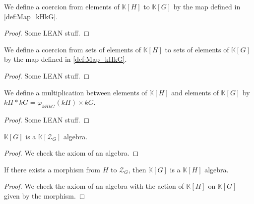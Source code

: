 \begin{definition}
    \label{def:Coe_kH_kG}
    \leanok
    We define a coercion from elements of $\mathbb{K}[H]$ to $\mathbb{K}[G]$ by the map defined in \ref{def:Map_kHkG}.
    \begin{proof}
        \leanok
        Some LEAN stuff.
    \end{proof}
\end{definition}

\begin{definition}
    \label{def:Set_Coe}
    \leanok
    We define a coercion from sets of elements of $\mathbb{K}[H]$ to sets of elements of $\mathbb{K}[G]$ by 
    the map defined in \ref{def:Map_kHkG}.
    \begin{proof}
        \leanok
        Some LEAN stuff.
    \end{proof}
\end{definition}

\begin{definition}
    \label{def:Smul_kHkG}
    \leanok
    We define a multiplication between elements of $\mathbb{K}[H]$ and elements of $\mathbb{K}[G]$ by 
    $kH*kG=\varphi_{kHkG}(kH)\times kG$.
    \begin{proof}
        \leanok
        Some LEAN stuff.
    \end{proof}
\end{definition}

\begin{proposition}
    \label{prop:kG_is_kCenter_Algebra}
    \leanok
    $\mathbb{K}[G]$ is a $\mathbb{K}[\mathcal{Z}_G]$ algebra.
\end{proposition}
\begin{proof}
    \leanok
    We check the axiom of an algebra.
\end{proof}

\begin{proposition}
    \label{prop:kG_is_kH_Algebra}
    \leanok
    If there exists a morphism from $H$ to $\mathcal{Z}_G$, then $\mathbb{K}[G]$ is a $\mathbb{K}[H]$ algebra.
\end{proposition}
\begin{proof}
    \leanok
    We check the axiom of an algebra with the action of $\mathbb{K}[H]$ on $\mathbb{K}[G]$ given by the morphism.
\end{proof}

